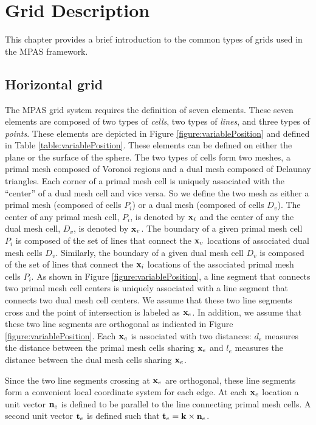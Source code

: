 \chapter{Grid Description}
\label{chap:mpas_grid_description}

This chapter provides a brief introduction to the common types of grids used in the MPAS framework. 

\section{Horizontal grid}

The MPAS grid system requires the definition of seven elements. These seven elements are composed of two types of {\it cells}, two types of {\it lines}, and three types of {\it points}. These elements are depicted in Figure \ref{figure:variablePosition} and defined in Table \ref{table:variablePosition}.  These elements can be defined on either the plane or the surface of the sphere. The two types of cells form two meshes, a primal mesh composed of Voronoi regions and a dual mesh composed of Delaunay triangles. Each corner of a primal mesh cell is uniquely associated with the ``center'' of a dual mesh cell and vice versa. So we define the two mesh as either a primal mesh (composed of cells $P_i$) or a dual mesh (composed of cells $D_v$). The center of any primal mesh cell, $P_i$, is denoted by ${\bf x}_i$ and the center of any the dual mesh cell, $D_v$, is denoted by ${\bf x}_v$. The boundary of a given primal mesh cell $P_i$ is composed of the set of lines that connect the ${\bf x}_v$ locations of associated dual mesh cells $D_v$. Similarly, the boundary of a given dual mesh cell $D_v$ is composed of the set of lines that connect the ${\bf x}_i$ locations of the associated primal mesh cells $P_i$. 
%
As shown in Figure \ref{figure:variablePosition}, a line segment that connects two primal mesh cell centers is uniquely associated with a line segment that connects two dual mesh cell centers. We assume that these two line segments cross and the point of intersection is labeled as ${\bf x}_e$. In addition, we assume that these two line segments are orthogonal as indicated in Figure \ref{figure:variablePosition}. Each ${\bf x}_e$ is associated with two distances: $d_e$ measures the distance between the primal mesh cells sharing ${\bf x}_e$ and $l_e$ measures the distance between the dual mesh cells sharing ${\bf x}_e$.

Since the two line segments crossing at ${\bf x}_e$ are orthogonal, these line segments form a convenient local coordinate system for each edge. At each ${\bf x}_e$ location a unit vector ${\bf n}_e$ is defined to be parallel to the line connecting primal mesh cells. A second unit vector ${\bf t}_e$ is defined such that ${\bf t}_e = {\bf k} \times {\bf n}_e$.

